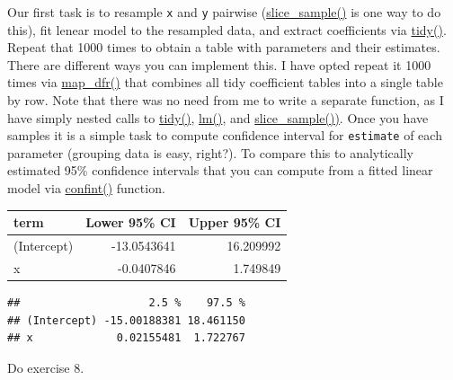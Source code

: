 \documentclass[
]{book}
\begin{document}
Our first task is to resample \texttt{x} and \texttt{y} pairwise (\href{https://dplyr.tidyverse.org/reference/slice.html}{slice\_sample()} is one way to do this), fit lenear model to the resampled data, and extract coefficients via \href{https://broom.tidymodels.org/reference/tidy.lm.html}{tidy()}. Repeat that 1000 times to obtain a table with parameters and their estimates. There are different ways you can implement this. I have opted repeat it 1000 times via \href{https://purrr.tidyverse.org/reference/map.html}{map\_dfr()} that combines all tidy coefficient tables into a single table by row. Note that there was no need from me to write a separate function, as I have simply nested calls to \href{https://broom.tidymodels.org/reference/tidy.lm.html}{tidy()}, \href{https://stat.ethz.ch/R-manual/R-devel/library/stats/html/lm.html}{lm()}, and \href{(https://dplyr.tidyverse.org/reference/slice.html)}{slice\_sample())}. Once you have samples it is a simple task to compute confidence interval for \texttt{estimate} of each parameter (grouping data is easy, right?). To compare this to analytically estimated 95\% confidence intervals that you can compute from a fitted linear model via \href{https://stat.ethz.ch/R-manual/R-devel/library/stats/html/confint.html}{confint()} function.

\begin{tabular}{l|r|r}
\hline
term & Lower 95\% CI & Upper 95\% CI\\
\hline
(Intercept) & -13.0543641 & 16.209992\\
\hline
x & -0.0407846 & 1.749849\\
\hline
\end{tabular}

\begin{verbatim}
##                    2.5 %    97.5 %
## (Intercept) -15.00188381 18.461150
## x             0.02155481  1.722767
\end{verbatim}

Do exercise 8.
\end{document}
